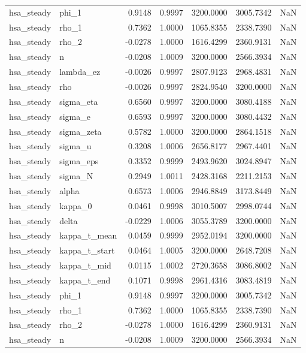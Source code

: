 \begin{tabular}{llrrrrl}
hsa\_steady & phi\_1 & 0.9148 & 0.9997 & 3200.0000 & 3005.7342 & NaN \\
hsa\_steady & rho\_1 & 0.7362 & 1.0000 & 1065.8355 & 2338.7390 & NaN \\
hsa\_steady & rho\_2 & -0.0278 & 1.0000 & 1616.4299 & 2360.9131 & NaN \\
hsa\_steady & n & -0.0208 & 1.0009 & 3200.0000 & 2566.3934 & NaN \\
hsa\_steady & lambda\_ez & -0.0026 & 0.9997 & 2807.9123 & 2968.4831 & NaN \\
hsa\_steady & rho & -0.0026 & 0.9997 & 2824.9540 & 3200.0000 & NaN \\
hsa\_steady & sigma\_eta & 0.6560 & 0.9997 & 3200.0000 & 3080.4188 & NaN \\
hsa\_steady & sigma\_e & 0.6593 & 0.9997 & 3200.0000 & 3080.4432 & NaN \\
hsa\_steady & sigma\_zeta & 0.5782 & 1.0000 & 3200.0000 & 2864.1518 & NaN \\
hsa\_steady & sigma\_u & 0.3208 & 1.0006 & 2656.8177 & 2967.4401 & NaN \\
hsa\_steady & sigma\_eps & 0.3352 & 0.9999 & 2493.9620 & 3024.8947 & NaN \\
hsa\_steady & sigma\_N & 0.2949 & 1.0011 & 2428.3168 & 2211.2153 & NaN \\
hsa\_steady & alpha & 0.6573 & 1.0006 & 2946.8849 & 3173.8449 & NaN \\
hsa\_steady & kappa\_0 & 0.0461 & 0.9998 & 3010.5007 & 2998.0744 & NaN \\
hsa\_steady & delta & -0.0229 & 1.0006 & 3055.3789 & 3200.0000 & NaN \\
hsa\_steady & kappa\_t\_mean & 0.0459 & 0.9999 & 2952.0194 & 3200.0000 & NaN \\
hsa\_steady & kappa\_t\_start & 0.0464 & 1.0005 & 3200.0000 & 2648.7208 & NaN \\
hsa\_steady & kappa\_t\_mid & 0.0115 & 1.0002 & 2720.3658 & 3086.8002 & NaN \\
hsa\_steady & kappa\_t\_end & 0.1071 & 0.9998 & 2961.4316 & 3083.4819 & NaN \\
hsa\_steady & phi\_1 & 0.9148 & 0.9997 & 3200.0000 & 3005.7342 & NaN \\
hsa\_steady & rho\_1 & 0.7362 & 1.0000 & 1065.8355 & 2338.7390 & NaN \\
hsa\_steady & rho\_2 & -0.0278 & 1.0000 & 1616.4299 & 2360.9131 & NaN \\
hsa\_steady & n & -0.0208 & 1.0009 & 3200.0000 & 2566.3934 & NaN \\

\end{tabular}
